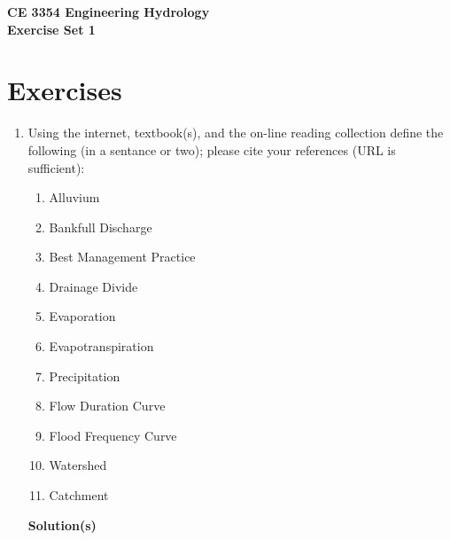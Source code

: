 \documentclass[12pt]{article}
\begin{document}
\begin{center}
{\textbf{{ CE 3354 Engineering Hydrology} \\ {Exercise Set 1}}}
\end{center}

\section*{\small{Exercises}}
\begin{enumerate}\item Using the internet, textbook(s), and the on-line reading collection define the following (in a sentance or two); please cite your references (URL is sufficient): 
 \begin{enumerate}
 \item Alluvium 
 \item Bankfull Discharge
 \item Best Management Practice
 \item Drainage Divide 
 \item Evaporation 
 \item Evapotranspiration 
 \item Precipitation 
 \item Flow Duration Curve
 \item Flood Frequency Curve
 \item Watershed 
 \item Catchment
 \end{enumerate}
 
\textbf{Solution(s)}


\end{enumerate}
\end{document}

